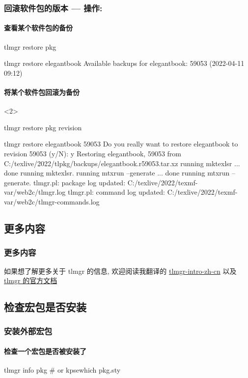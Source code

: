 \begin{frame}[fragile]
  \frametitle{回滚软件包的版本 --- 操作: }
  
  \framesubtitle<1>{查看某个软件包的备份} 
\begin{cmdcode}
tlmgr restore pkg
\end{cmdcode}
\begin{outputcode}
tlmgr restore elegantbook
Available backups for elegantbook: 59053 (2022-04-11 09:12)
\end{outputcode}
  \framesubtitle<2>{将某个软件包回滚为备份}

\begin{uncoverenv}<2>
\begin{cmdcode}
tlmgr restore pkg revision
\end{cmdcode}
\begin{outputcode}
tlmgr restore elegantbook 59053
Do you really want to restore elegantbook to revision 59053 (y/N): y
Restoring elegantbook, 59053 from C:/texlive/2022/tlpkg/backups/elegantbook.r59053.tar.xz
running mktexlsr ...
done running mktexlsr.
running mtxrun --generate ...
done running mtxrun --generate.
tlmgr.pl: package log updated: C:/texlive/2022/texmf-var/web2c/tlmgr.log
tlmgr.pl: command log updated: C:/texlive/2022/texmf-var/web2c/tlmgr-commands.log
\end{outputcode}
\end{uncoverenv}
\end{frame}

\subsection{更多内容}

\begin{frame}
  \frametitle{更多内容}
  如果想了解更多关于 tlmgr 的信息, 欢迎阅读我翻译的 \href{http://mirrors.ctan.org/info/tlmgr-intro-zh-cn/tlmgr-intro-zh-cn.pdf}{tlmgr-intro-zh-cn} 以及 \href{https://www.tug.org/texlive/doc/tlmgr.html}{tlmgr 的官方文档}
\end{frame}




\subsection{检查宏包是否安装}

\begin{frame}[fragile]
  \frametitle{安装外部宏包}
  \framesubtitle{检查一个宏包是否被安装了}
\begin{cmdcode}
tlmgr info pkg
# or 
kpsewhich pkg.sty
\end{cmdcode}
\end{frame}

